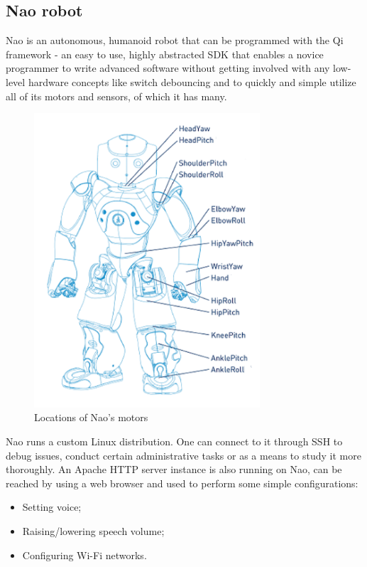 \documentclass[12pt, fleqn, a4paper]{article}
\begin{document}
\subsection{Nao robot}
Nao is an autonomous, humanoid robot that can be programmed with the Qi framework - an easy to use, highly abstracted SDK that enables a novice programmer to write advanced software without getting involved with any low-level hardware concepts like switch debouncing and to quickly and simple utilize all of its motors and sensors, of which it has many.
\begin{figure}[H]
	\centering
	\includegraphics[width=0.75\textwidth]{img/nao.png}
	\caption{Locations of Nao's motors}
\end{figure}
Nao runs a custom Linux distribution. One can connect to it through SSH to debug issues, conduct certain administrative tasks or as a means to study it more thoroughly. An Apache HTTP server instance is also running on Nao, can be reached by using a web browser and used to perform some simple configurations:
\begin{itemize}
	\item Setting voice;
	\item Raising/lowering speech volume;
	\item Configuring Wi-Fi networks.
\end{itemize}
\par
\end{document}
